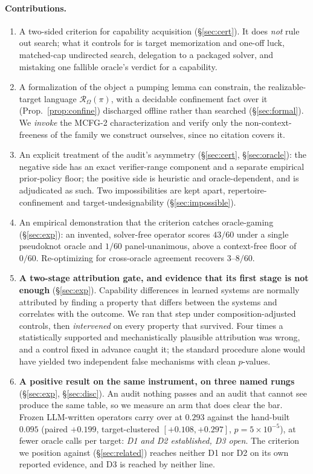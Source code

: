 \documentclass[11pt]{article}
\newcommand{\Rze}[2]{\ensuremath{\mathcal{R}_{#1}(#2)}}
\begin{document}
\paragraph{Contributions.}
\begin{enumerate}[leftmargin=1.3em,itemsep=1.5pt]
\item A two-sided criterion for capability acquisition (\S\ref{sec:cert}). It does \emph{not} rule out search;
what it controls for is target memorization and one-off luck, matched-cap undirected search, delegation to a
packaged solver, and mistaking one fallible oracle's verdict for a capability.
\item A formalization of the object a pumping lemma can constrain, the realizable-target language
$\Rze{\Omega}{\pi}$, with a decidable confinement fact over it (Prop.~\ref{prop:confine}) discharged offline
rather than searched (\S\ref{sec:formal}). We \emph{invoke} the MCFG-2 characterization and verify only the
non-context-freeness of the family we construct ourselves, since no citation covers it.
\item An explicit treatment of the audit's asymmetry (\S\ref{sec:cert}, \S\ref{sec:oracle}): the negative side
has an exact verifier-range component and a separate empirical prior-policy floor; the positive side is
heuristic and oracle-dependent, and is adjudicated as such. Two impossibilities are kept apart,
repertoire-confinement and target-undesignability (\S\ref{sec:impossible}).
\item An empirical demonstration that the criterion catches oracle-gaming (\S\ref{sec:exp}): an invented,
solver-free operator scores $43/60$ under a single pseudoknot oracle and $1/60$ panel-unanimous, above a
context-free floor of $0/60$. Re-optimizing for cross-oracle agreement recovers $3$--$8/60$.
\item \textbf{A two-stage attribution gate, and evidence that its first stage is not enough}
(\S\ref{sec:exp}). Capability differences in learned systems are normally attributed by finding a property that differs between
the systems and correlates with the outcome. We ran that step under composition-adjusted controls, then
\emph{intervened} on every property that survived. Four times a statistically supported and mechanistically
plausible attribution was wrong, and a control fixed in advance caught it; the standard procedure alone would
have yielded two independent false mechanisms with clean $p$-values.
\item \textbf{A positive result on the same instrument, on three named rungs} (\S\ref{sec:exp},
\S\ref{sec:disc}). An audit nothing passes and an audit that cannot see produce the same table, so we measure an arm that does
clear the bar. Frozen LLM-written operators carry over at $0.293$ against the hand-built $0.095$ (paired
${+}0.199$, target-clustered $[{+}0.108,{+}0.297]$, $p{=}5\!\times\!10^{-5}$), at fewer oracle calls per
target: \emph{D1 and D2 established, D3 open}. The criterion we position against (\S\ref{sec:related})
reaches neither D1 nor D2 on its own reported evidence, and D3 is reached by neither line.
\end{enumerate}
\end{document}
